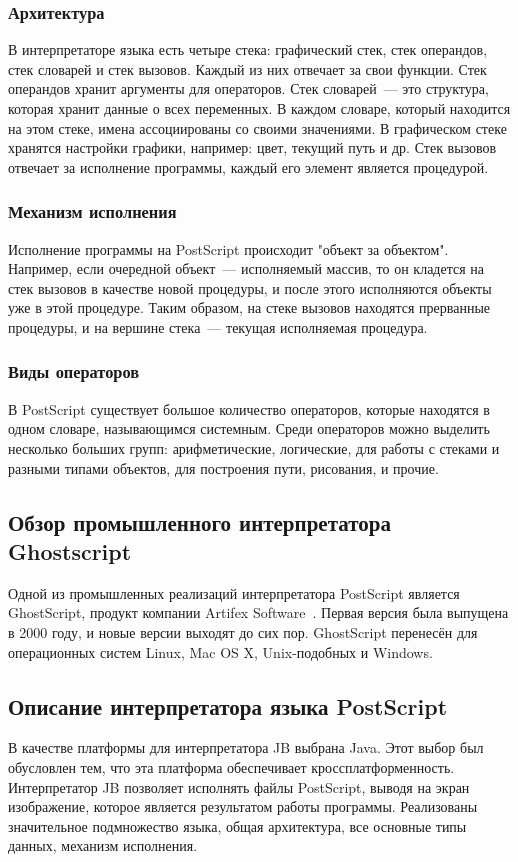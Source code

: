 	 \subsubsection*{Архитектура}
	 В интерпретаторе языка есть четыре стека: графический стек, стек операндов, стек словарей и стек вызовов. Каждый из них отвечает за свои функции. Стек операндов хранит аргументы для операторов. Стек словарей~--- это структура, которая хранит данные о всех переменных. В каждом словаре, который находится на этом стеке, имена ассоциированы со своими значениями. В графическом стеке хранятся настройки графики, например: цвет, текущий путь и др. Стек вызовов отвечает за исполнение программы, каждый его элемент является процедурой.
	 \subsubsection*{Механизм исполнения}
	 Исполнение программы на PostScript происходит "объект за объектом". Например, если очередной объект~--- исполняемый массив, то он кладется на стек вызовов в качестве новой процедуры, и после этого исполняются объекты уже в этой процедуре. Таким образом, на стеке вызовов находятся прерванные процедуры, и на вершине стека~--- текущая исполняемая процедура.
	 \subsubsection*{Виды операторов}
	 В PostScript существует большое количество операторов, которые находятся в одном словаре, называющимся системным. Среди операторов можно выделить несколько больших групп: арифметические, логические, для работы с стеками и разными типами объектов, для построения пути, рисования, и прочие. 
 
	 \subsection{Обзор промышленного интерпретатора Ghostscript}
	 Одной из промышленных реализаций интерпретатора PostScript является GhostScript, продукт компании Artifex Software~\cite{artifex-site}. Первая версия была выпущена в 2000 году, и новые версии выходят до сих пор. GhostScript перенесён для операционных систем Linux, Mac OS X, Unix-подобных и Windows.
	\subsection{Описание интерпретатора языка PostScript}
	В качестве платформы для интерпретатора JB выбрана Java. Этот выбор был обусловлен тем, что эта платформа обеспечивает  кроссплатформенность. Интерпретатор JB позволяет исполнять файлы PostScript, выводя на экран изображение, которое является результатом работы программы. Реализованы значительное подмножество языка, общая архитектура, все основные типы данных, механизм исполнения. 
	
